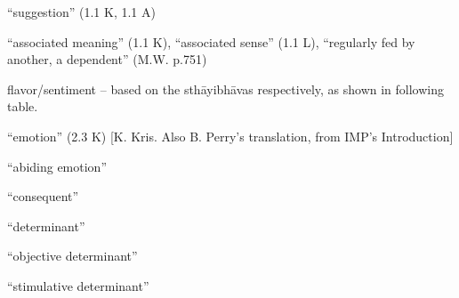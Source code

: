 \documentclass[12pt]{article}
\begin{document}
\begin{multicols}{2}

	\begin{enumerate}
		 ``suggestion'' (1.1 K, 1.1 A)

		 ``associated meaning'' (1.1 K), ``associated sense'' (1.1 L), ``regularly fed by another, a dependent'' (M.W. p.751)

		 flavor/sentiment -- based on the sthāyibhāvas respectively, as shown in following table.


		 ``emotion'' (2.3 K) [K. Kris. Also B. Perry's translation, from IMP's Introduction]


		 ``abiding emotion''

		 ``consequent''

		 ``determinant''
		\begin{enumerate}
			 ``objective determinant''

			 ``stimulative determinant''
		\end{enumerate}


\end{enumerate}
\end{multicols}
\end{document}
